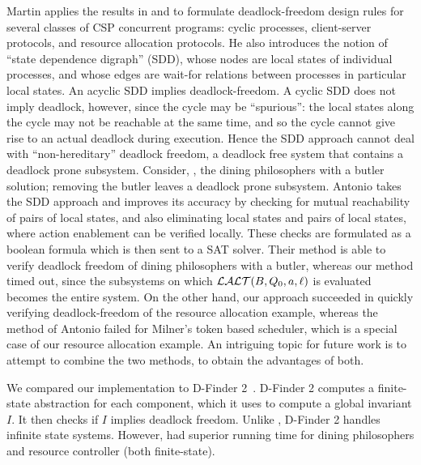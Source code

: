 Martin \cite{Ma96} applies the results in \cite{RD87} and \cite{BR91} to formulate deadlock-freedom design rules for several classes of CSP concurrent
programs: cyclic processes, client-server protocols, and resource allocation protocols. He also introduces the notion of ``state dependence digraph''
(SDD), whose nodes are local states of individual processes, and whose edges are wait-for relations between processes in particular local states. An
acyclic SDD implies deadlock-freedom. A cyclic SDD does not imply deadlock, however, since the cycle may be ``spurious'': the local states along the
cycle may not be reachable at the same time, and so the cycle cannot give rise to an actual deadlock during execution. Hence the SDD approach cannot
deal with ``non-hereditary'' deadlock freedom, \ie a deadlock free system that contains a deadlock prone subsystem. Consider, \eg, the dining
philosophers with a butler solution; removing the butler leaves a deadlock prone subsystem.
%
Antonio \etal \cite{AGR16} takes the SDD approach and improves its accuracy by checking for mutual reachability of pairs of local states, and also
eliminating local states and pairs of local states, where action enablement can be verified locally.
These checks are formulated as a boolean formula which is then sent to
a SAT solver. Their method is able to verify deadlock freedom of
dining philosophers with a butler, whereas our method timed out, %
since the subsystems on which $\mathcal{LALT}(B, Q_0, a, \ell)$ is evaluated becomes the entire system.
On the other hand, our approach succeeded in quickly verifying deadlock-freedom of the resource
allocation example, whereas the method of 
Antonio \etal \cite{AGR16} failed for Milner's token based scheduler, which is a special
case of our resource allocation example.
%
An intriguing topic for future work is to attempt to combine the two methods, to obtain the
advantages of both.



We compared our implementation \deadlocktool to D-Finder 2~\cite{DFinder2}. D-Finder 2
computes a finite-state abstraction for each component, which it uses
to compute a global invariant $I$. It then checks if $I$ 
implies deadlock freedom.  Unlike \deadlocktool, D-Finder 2 
handles infinite state systems.
However, \deadlocktool had superior running time for
dining philosophers and resource controller (both finite-state).



